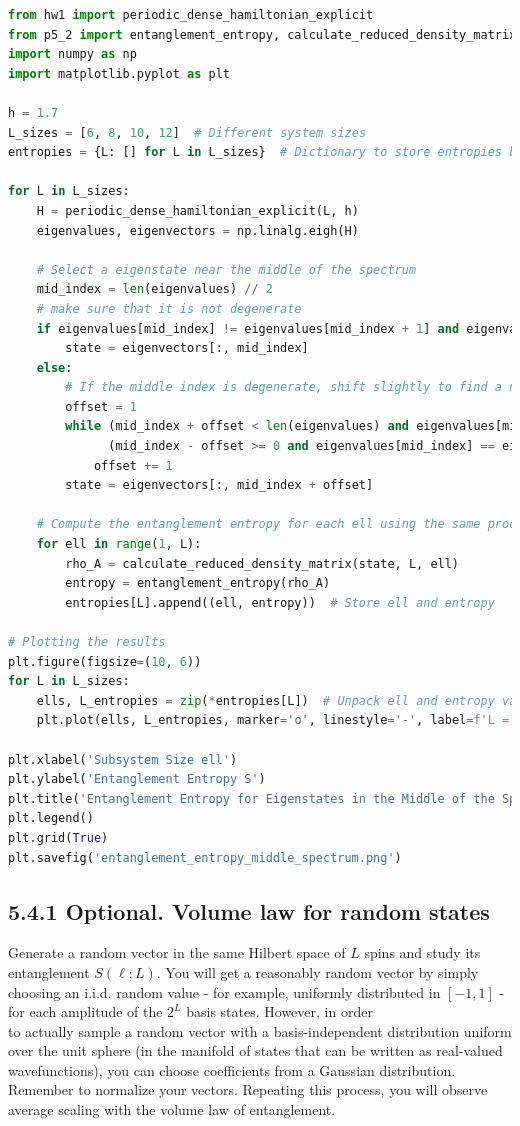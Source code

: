 \documentclass[12pt]{article}
\begin{document}
\begin{lstlisting}[language=Python]
from hw1 import periodic_dense_hamiltonian_explicit
from p5_2 import entanglement_entropy, calculate_reduced_density_matrix
import numpy as np
import matplotlib.pyplot as plt

h = 1.7
L_sizes = [6, 8, 10, 12]  # Different system sizes
entropies = {L: [] for L in L_sizes}  # Dictionary to store entropies by L

for L in L_sizes:
    H = periodic_dense_hamiltonian_explicit(L, h)
    eigenvalues, eigenvectors = np.linalg.eigh(H)

    # Select a eigenstate near the middle of the spectrum
    mid_index = len(eigenvalues) // 2
    # make sure that it is not degenerate
    if eigenvalues[mid_index] != eigenvalues[mid_index + 1] and eigenvalues[mid_index] != eigenvalues[mid_index - 1]:
        state = eigenvectors[:, mid_index]
    else:
        # If the middle index is degenerate, shift slightly to find a non-degenerate state
        offset = 1
        while (mid_index + offset < len(eigenvalues) and eigenvalues[mid_index] == eigenvalues[mid_index + offset]) or \
              (mid_index - offset >= 0 and eigenvalues[mid_index] == eigenvalues[mid_index - offset]):
            offset += 1
        state = eigenvectors[:, mid_index + offset]

    # Compute the entanglement entropy for each ell using the same procedure as in p5_2.py
    for ell in range(1, L):
        rho_A = calculate_reduced_density_matrix(state, L, ell)
        entropy = entanglement_entropy(rho_A)
        entropies[L].append((ell, entropy))  # Store ell and entropy

# Plotting the results
plt.figure(figsize=(10, 6))
for L in L_sizes:
    ells, L_entropies = zip(*entropies[L])  # Unpack ell and entropy values for each L
    plt.plot(ells, L_entropies, marker='o', linestyle='-', label=f'L = {L}')

plt.xlabel('Subsystem Size ell')
plt.ylabel('Entanglement Entropy S')
plt.title('Entanglement Entropy for Eigenstates in the Middle of the Spectrum')
plt.legend()
plt.grid(True)
plt.savefig('entanglement_entropy_middle_spectrum.png')
\end{lstlisting}
\newpage
\subsection*{5.4.1 Optional. Volume law for random states}
Generate a random vector in the same Hilbert space of $L$ spins and study its entanglement $S(\ell ; L)$. You will get a reasonably random vector by simply choosing an i.i.d. random value - for example, uniformly distributed in $[-1,1]$ - for each amplitude of the $2^{L}$ basis states. However, in order\\
to actually sample a random vector with a basis-independent distribution uniform over the unit sphere (in the manifold of states that can be written as real-valued wavefunctions), you can choose coefficients from a Gaussian distribution. Remember to normalize your vectors. Repeating this process, you will observe average scaling with the volume law of entanglement.
\newpage
\end{document}
